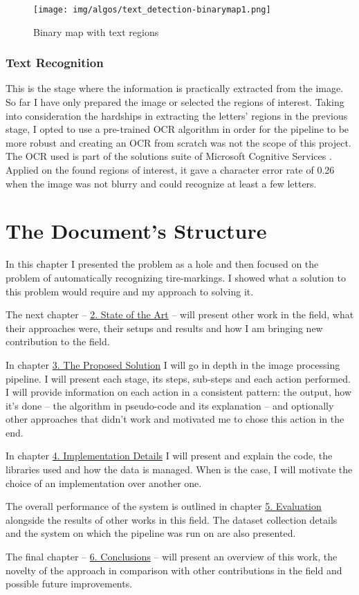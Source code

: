 \begin{figure}
    \centering
    \texttt{[image: img/algos/text\_detection-binarymap1.png]}
    \caption{Binary map with text regions}
    \label{fig:text_detection-binarymap}
\end{figure}

\subsubsection{Text Recognition}

This is the stage where the information is practically extracted from the image. So far I have only prepared the image or selected the regions of interest. Taking into consideration the hardships in extracting the letters' regions in the previous stage, I opted to use a pre-trained OCR algorithm in order for the pipeline to be more robust and creating an OCR from scratch was not the scope of this project. The OCR used is part of the solutions suite of Microsoft Cognitive Services \cite{site:Microsoft_Cognitive_Services}. Applied on the found regions of interest, it gave a character error rate of 0.26 when the image was not blurry and could recognize at least a few letters.

\section{The Document's Structure}

In this chapter I presented the problem as a hole and then focused on the problem of automatically recognizing tire-markings. I showed what a solution to this problem would require and my approach to solving it.

The next chapter -- \hyperref[chap:state-of-the-art]{2. State of the Art} -- will present other work in the field, what their approaches were, their setups and results and how I am bringing new contribution to the field.

In chapter \hyperref[chap:proposed-solution]{3. The Proposed Solution} I will go in depth in the image processing pipeline. I will present each stage, its steps, sub-steps and each action performed. I will provide information on each action in a consistent pattern: the output, how it's done -- the algorithm in pseudo-code and its explanation -- and optionally other approaches that didn't work and motivated me to chose this action in the end.

In chapter \hyperref[chap:implementation-details]{4. Implementation Details} I will present and explain the code, the libraries used and how the data is managed. When is the case, I will motivate the choice of an implementation over another one.

The overall performance of the system is outlined in chapter \hyperref[chap:evaluation]{5. Evaluation} alongside the results of other works in this field. The dataset collection details and the system on which the pipeline was run on are also presented.

The final chapter -- \hyperref[chap:conclusions]{6. Conclusions} -- will present an overview of this work, the novelty of the approach in comparison with other contributions in the field and possible future improvements.
